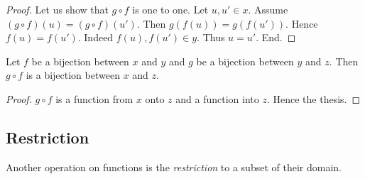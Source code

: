 \documentclass[../../set-theory.ftl.tex]{subfiles}
\begin{document}
\begin{forthel}
\begin{proof}
      Let us show that $g \circ f$ is one to one.
        Let $u,u' \in x$.
        Assume $(g \circ f)(u) = (g \circ f)(u')$.
        Then $g(f(u)) = g(f(u'))$.
        Hence $f(u) = f(u')$.
        Indeed $f(u), f(u') \in y$.
        Thus $u = u'$.
      End.
    \end{proof}

    \begin{corollary}\label{SetTheory_02_01_627406}
      Let $f$ be a bijection between $x$ and $y$ and $g$ be a bijection between $y$ and $z$.
      Then $g \circ f$ is a bijection between $x$ and $z$.
    \end{corollary}
    \begin{proof}
      $g \circ f$ is a function from $x$ onto $z$ and a function into $z$.
      Hence the thesis.
    \end{proof}
  \end{forthel}


  \subsection{Restriction}

  Another operation on functions is the \textit{restriction} to a subset of
  their domain.
\end{document}
